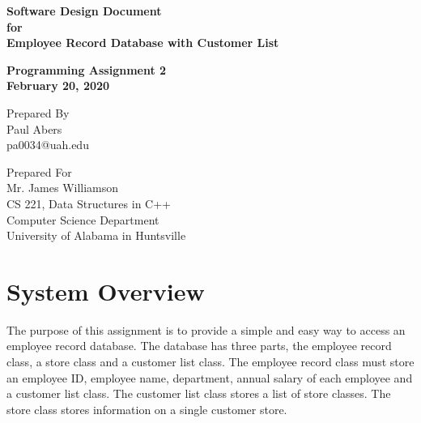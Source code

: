\documentclass[12pt]{article}%
\begin{document}
\begin{titlepage}
	\clearpage\thispagestyle{empty}
	\centering
	\vspace{2cm}

	{\Huge \textbf{Software Design Document \\
        for \\
        Employee Record Database with Customer List}} \\
	\vspace{1cm}
	{\large \textbf{Programming Assignment 2 \\
      February 20, 2020} \par}
	\vspace{4cm}
	{\normalsize Prepared By \\ %
      Paul Abers \\
      pa0034@uah.edu \par}
	\vspace{2cm}

    \vspace{2cm}

	{\normalsize Prepared For \\
		Mr. James Williamson \\
		CS 221, Data Structures in C++ \\
        Computer Science Department \\
        University of Alabama in Huntsville \par}

      \vspace{2cm}

	\pagebreak

\end{titlepage}

\tableofcontents

\section{System Overview}
The purpose of this assignment is to provide a simple and easy way
to access an employee record database. The database has three parts,
the employee record class, a store class and a customer list class.
The employee record class must store an employee ID,
employee name, department, annual salary of each employee and a customer
list class. The customer list class stores a list of store classes. The store
class stores information on a single customer store.
\end{document}

